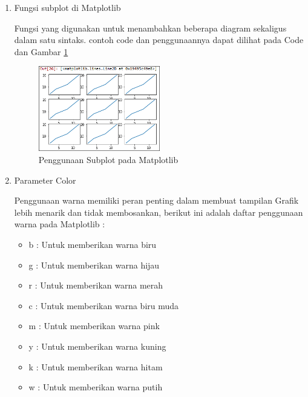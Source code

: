 \begin{enumerate}
\item Fungsi subplot di Matplotlib
\par Fungsi yang digunakan untuk menambahkan beberapa diagram sekaligus dalam satu sintaks. contoh code dan penggunaannya dapat dilihat pada Code dan Gambar \ref{data1}

\begin{figure} [!htbp]
	\centerline{\includegraphics[width=0.5\textwidth]{figures/chapter6/1164074/1}}
	\caption{Penggunaan Subplot pada Matplotlib}
	\label{data1}
\end{figure}

\item Parameter Color
\par Penggunaan warna memiliki peran penting dalam membuat tampilan Grafik lebih menarik dan tidak membosankan, berikut ini adalah daftar penggunaan warna pada Matplotlib :

\begin{itemize}
	\item b : Untuk memberikan warna biru
	\item g : Untuk memberikan warna hijau
	\item r : Untuk memberikan warna merah
	\item c : Untuk memberikan warna biru muda
	\item m : Untuk memberikan warna pink
	\item y : Untuk memberikan warna kuning
	\item k : Untuk memberikan warna hitam
	\item w : Untuk memberikan warna putih
\end{itemize}



\end{enumerate}
